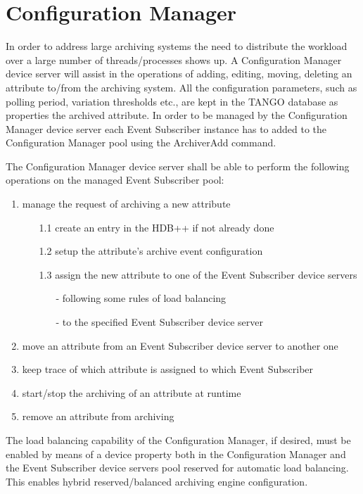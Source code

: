 \documentclass[11pt,a4paper]{article}
\def \es{Event Subscriber}
\def \cm{Configuration Manager}
\def \tango{TANGO}
\begin{document}
\newpage{\clearpage}

\section{\cm}
\label{cm}
In order to address large archiving systems the need to
distribute the workload over a large number of \mbox{threads/processes}
shows up. A \cm{} device server will assist in the operations of adding,
editing, moving, deleting an attribute \mbox{to/from} the archiving system.
All the configuration parameters, such as polling period, variation
thresholds etc., are kept in the \tango{} database as properties the
archived attribute.
In order to be managed by the \cm{} device server each \es{} instance
has to added to the \cm{} pool using the ArchiverAdd command.

The \cm{} device server shall be able to perform the following operations
on the managed \es{} pool:
\begin{enumerate}
	\item manage the request of archiving a new attribute
	\begin{itemize}
		\item[\small{1.1}] create an entry in the HDB++ if not already done
		\item[\small{1.2}] setup the attribute's archive event configuration
		\item[\small{1.3}] assign the new attribute to one of the \es{}
					device servers
		\begin{itemize}
			\item[-] following some rules of load balancing
			\item[-] to the specified \es{} device server
		\end{itemize}
		
	\end{itemize}
	\item move an attribute from an \es{} device server to another one
	\item keep trace of which attribute is assigned to which \es
	\item start/stop the archiving of an attribute at runtime
	\item remove an attribute from archiving
\end{enumerate}
The load balancing capability of the \cm{}, if desired, must be enabled
by means of a device property both in the \cm{} and the \es{} device servers
pool reserved for automatic load balancing. This enables hybrid
reserved/balanced archiving engine configuration. 
\end{document}
